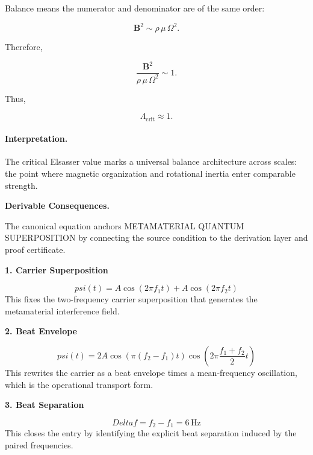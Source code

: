 Balance means the numerator and denominator are of the same order:

\begin{equation}
\mathbf{B}^2
\sim
\rho\,\mu\,\Omega^2 .
\end{equation}

Therefore,

\begin{equation}
\frac{\mathbf{B}^2}
{\rho\,\mu\,\Omega^2}
\sim
1 .
\end{equation}

Thus,

\begin{equation}
\boxed{
\Lambda_{\mathrm{crit}}\approx 1 .
}
\end{equation}

\paragraph{Interpretation.}
The critical Elsasser value marks a universal balance architecture across scales: the point where magnetic organization and rotational inertia enter comparable strength.

\par\vspace{0.35em}
\noindent\textbf{Derivable Consequences.}\quad
\begingroup
\footnotesize
\raggedright
The canonical equation anchors METAMATERIAL QUANTUM SUPERPOSITION by connecting the source condition to the derivation layer and proof certificate.
\par\endgroup

\noindent\textbf{1. Carrier Superposition}\par
\[
psi(t) = A\cos(2\pi f_{1}t) + A\cos(2\pi f_{2}t)
\]
\noindent This fixes the two-frequency carrier superposition that generates the metamaterial interference field.\par
\noindent\textbf{2. Beat Envelope}\par
\[
psi(t) = 2A\cos\!\left(\pi(f_{2}-f_{1})t\right)\cos\!\left(2\pi\frac{f_{1}+f_{2}}{2}t\right)
\]
\noindent This rewrites the carrier as a beat envelope times a mean-frequency oscillation, which is the operational transport form.\par
\noindent\textbf{3. Beat Separation}\par
\[
Delta f = f_{2} - f_{1} = 6\,\mathrm{Hz}
\]
\noindent This closes the entry by identifying the explicit beat separation induced by the paired frequencies.\par

